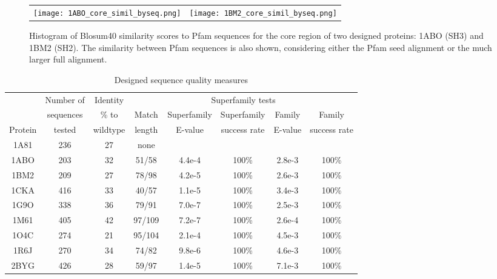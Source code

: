     \begin{figure}[!htbp]
      \centering
      \begin{tabular}{cc}
        \texttt{[image: 1ABO\_core\_simil\_byseq.png]} &
        \texttt{[image: 1BM2\_core\_simil\_byseq.png]} \\
      \end{tabular}
      \caption{Histogram of Blosum40 similarity scores to Pfam sequences for the core region of two
designed proteins: 1ABO (SH3) and 1BM2 (SH2). The similarity between Pfam sequences is
also shown, considering either the Pfam seed alignment or the much larger full alignment.
}
      \label{fig:similarity}
    \end{figure}





\begin{table}[!htbp]                            
\caption{Designed sequence quality measures}
\small
\label{tab:quality}                      
\begin{center}
\begin{tabular}{cccccccc} \hline \hline  
        & Number of & Identity & \multicolumn{5}{c}{\hrulefill Superfamily tests \hrulefill}   \\
        & sequences & \% to    & Match & Superfamily & Superfamily  & Family  & Family        \\
Protein & tested    & wildtype & length & E-value     & success rate & E-value & success rate  \\ \hline
1A81    & 236       & 27       & none   &             &              &         &               \\
1ABO    & 203       & 32       & 51/58  & 4.4e-4      & 100\%        & 2.8e-3  & 100\%         \\
1BM2    & 209       & 27       & 78/98  & 4.2e-5      & 100\%        & 2.6e-3  & 100\%         \\
1CKA    & 416       & 33       & 40/57  & 1.1e-5      & 100\%        & 3.4e-3  & 100\%         \\
1G9O    & 338       & 36       & 79/91  & 7.0e-7      & 100\%        & 2.5e-3  & 100\%         \\
1M61    & 405       & 42       & 97/109 & 7.2e-7      & 100\%        & 2.6e-4  & 100\%         \\
1O4C    & 274       & 21       & 95/104 & 2.1e-4      & 100\%        & 4.5e-3  & 100\%         \\
1R6J    & 270       & 34       & 74/82  & 9.8e-6      & 100\%        & 4.6e-3  & 100\%         \\
2BYG    & 426       & 28       & 59/97  & 1.4e-5      & 100\%        & 7.1e-3  & 100\%         \\ \hline
\end{tabular}
\end{center}
\end{table}



